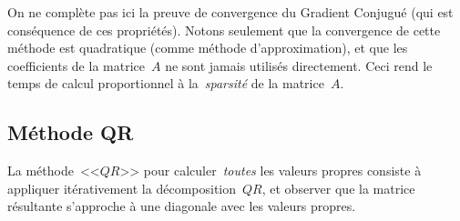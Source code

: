 \begin{remark}
	On ne complète pas ici la preuve de convergence du Gradient Conjugué (qui
	est conséquence de ces propriétés).  Notons seulement que la convergence de
	cette méthode est quadratique (comme méthode d'approximation), et que les
	coefficients de la matrice~$A$ ne sont jamais utilisés directement.  Ceci
	rend le temps de calcul proportionnel à la~\emph{sparsité} de la
	matrice~$A$.
\end{remark}





\subsection{Méthode QR}

La méthode~<<$QR$>> pour calculer~\emph{toutes} les valeurs propres consiste à
appliquer itérativement la décomposition~$QR$, et observer que la matrice
résultante s'approche à une diagonale avec les valeurs propres.

%
%
%

